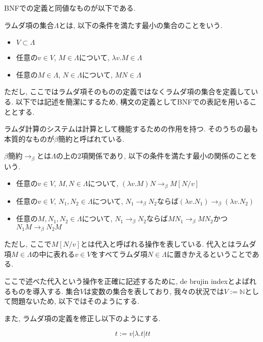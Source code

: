 \documentclass{ltjsarticle}
\begin{document}
BNFでの定義と同値なものが以下である.

\begin{defn}
 ラムダ項の集合$\Lambda$とは, 以下の条件を満たす最小の集合のことをいう.
 \begin{itemize}
  \item $V \subset \Lambda$
  \item 任意の$v \in V$, $M \in \Lambda$について, $\lambda v. M \in \Lambda$
  \item 任意の$M \in \Lambda$, $N \in \Lambda$について, $M N \in \Lambda$
 \end{itemize}
\end{defn}

ただし, ここではラムダ項そのものの定義ではなくラムダ項の集合を定義している. 以下では記述を簡潔にするため, 構文の定義としてBNFでの表記を用いることとする.

ラムダ計算のシステムは計算として機能するための作用を持つ. そのうちの最も本質的なものが$\beta$簡約と呼ばれている.

\begin{defn}
 $\beta$簡約$\rightarrow_{\beta}$とは$\Lambda$の上の$2$項関係であり, 以下の条件を満たす最小の関係のことをいう.
 \begin{itemize}
  \item 任意の$v \in V$, $M, N \in \Lambda$について, $(\lambda v. M) N \rightarrow_\beta M[N/v]$
  \item 任意の$v \in V$, $N_1, N_2 \in \Lambda$について, $N_1 \rightarrow_\beta N_2$ならば$(\lambda v. N_1) \rightarrow_\beta (\lambda v. N_2)$
  \item 任意の$M, N_1, N_2 \in \Lambda$について, $N_1 \rightarrow_\beta N_2$ならば$M N_1 \rightarrow_\beta M N_2$かつ$N_1 M \rightarrow_\beta N_2 M$
 \end{itemize}
 ただし, ここで$M[N/v]$とは代入と呼ばれる操作を表している. 代入とはラムダ項$M \in \Lambda$の中に表れる$v \in V$をすべてラムダ項$N \in \Lambda$に置きかえるということである.
\end{defn}

ここで述べた代入という操作を正確に記述するために, de brujin indexとよばれるものを導入する.
集合$V$は変数の集合を表しており, 我々の状況では$V := \mathbb{N}$として問題ないため, 以下ではそのようにする.

また, ラムダ項の定義を修正し以下のようにする.

\begin{defn}
 \[
 t := v | \lambda. t | t t
 \]
\end{defn}
\end{document}
